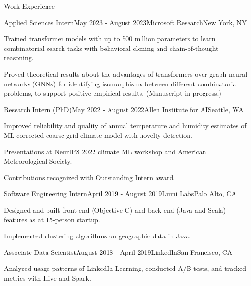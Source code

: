 \documentclass{resume} %
\begin{document}
\begin{rSection}{Work Experience}

\begin{rSubsection}{Applied Sciences Intern}{May 2023 - August 2023}{Microsoft Research}{New York, NY}
\item Trained transformer models with up to 500 million parameters to learn combinatorial search tasks with behavioral cloning and chain-of-thought reasoning.
\item Proved theoretical results about the advantages of transformers over graph neural networks (GNNs) for identifying isomorphisms between different combinatorial problems, to support positive empirical results. (Manuscript in progress.) 
\end{rSubsection}

\begin{rSubsection}{Research Intern (PhD)}{May 2022 - August 2022}{Allen Institute for AI}{Seattle, WA}
\item Improved reliability and quality of annual temperature and humidity estimates of ML-corrected coarse-grid climate model with novelty detection.
\item Presentations at NeurIPS 2022 climate ML workshop and American Meteorological Society.
\item Contributions recognized with Outstanding Intern award.
\end{rSubsection}


\begin{rSubsection}{Software Engineering Intern}{April 2019 - August 2019}{Lumi Labs}{Palo Alto, CA}
\item Designed and built front-end (Objective C) and back-end (Java and Scala) features as at 15-person startup.
\item Implemented clustering algorithms on geographic data in Java.
\end{rSubsection}

\begin{rSubsection}{Associate Data Scientist}{August 2018 - April 2019}{LinkedIn}{San Francisco, CA}
\item Analyzed usage patterns of LinkedIn Learning, conducted A/B tests, and tracked metrics with Hive and Spark.
\end{rSubsection}


\end{rSection}
\end{document}

